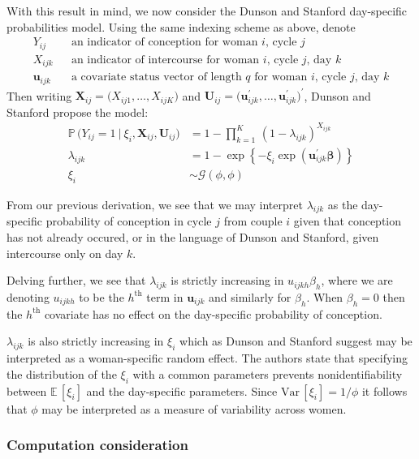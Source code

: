 \documentclass[11pt]{article}
\newcommand{\prob}{\mathbb{P}\,}
\newcommand{\ev}{\mathbb{E}\,}
\newcommand{\var}{\text{Var}\,}
\renewcommand{\vec}{\boldsymbol}
\begin{document}
With this result in mind, we now consider the Dunson and Stanford day-specific probabilities model.  Using the same indexing scheme as above, denote
\[ \begin{array}{lll}
Y_{ij} & & \text{an indicator of conception for woman $i$, cycle $j$} \\[1ex]
X_{ijk} & & \text{an indicator of intercourse for woman $i$, cycle $j$, day $k$} \\[1ex]
\vec{u}_{ijk} & & \text{a covariate status vector of length $q$ for  woman $i$, cycle $j$, day $k$}
\end{array} \]
Then writing $\vec{X}_{ij} = \big( X_{ij1}, \dots, X_{ijK} \big)$ and $\vec{U}_{ij} = \big( \vec{u}_{ijk}^\prime, \dots, \vec{u}_{ijk}^\prime \big)^\prime$, Dunson and Stanford propose the model:
\begin{align}
\prob\Big( Y_{ij} = 1 ~\big|~ \xi_i, \vec{X}_{ij}, \vec{U}_{ij} \Big) &= 1 - \prod_{k=1}^K\, (1 - \lambda_{ijk})^{X_{ijk}} \nonumber \\
\lambda_{ijk} &= 1 - \exp\left\{ -\xi_i \exp\left( \vec{u}_{ijk}^\prime \vec{\beta} \right) \right\} \nonumber \\[1ex]
\xi_i &\sim \mathcal{G}(\phi,\phi)
\end{align}

\noindent From our previous derivation, we see that we may interpret $\lambda_{ijk}$ as the day-specific probability of conception in cycle $j$ from couple $i$ given that conception has not already occured, or in the language of Dunson and Stanford, given intercourse only on day $k$.

Delving further, we see that $\lambda_{ijk}$ is strictly increasing in $u_{ijkh} \beta_{h}$, where we are denoting $u_{ijkh}$ to be the $h^{\text{th}}$ term in $\vec{u}_{ijk}$ and similarly for $\beta_h$.  When $\beta_h = 0$ then the $h^{\text{th}}$ covariate has no effect on the day-specific probability of conception.

$\lambda_{ijk}$ is also strictly increasing in $\xi_i$ which as Dunson and Stanford suggest may be interpreted as a woman-specific random effect.  The authors state that specifying the distribution of the $\xi_i$ with a common parameters prevents nonidentifiability between $\ev [\xi_i]$ and the day-specific parameters.  Since $\var[\xi_i] = 1 / \phi$ it follows that $\phi$ may be interpreted as a measure of variability across women. 

\subsubsection{Computation consideration}
\end{document}
